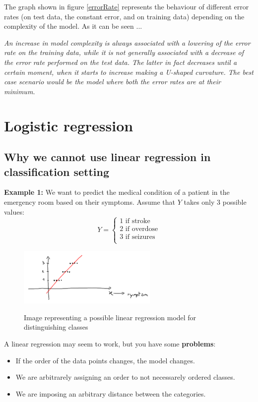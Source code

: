 The graph shown in figure \ref{errorRate} represents the behaviour of different
error rates (on test data, the constant error, and on training data) depending
on the complexity of the model. As it can be seen ... 

\begin{center}
\textit{An increase in model complexity is always associated with a lowering of
the error rate on the training data, while it is not generally associated with a
decrease of the error rate performed on the test data. The latter in fact
decreases until a certain moment, when it starts to increase making a U-shaped
curvature. The best case scenario would be the model where both the error rates
are at their minimum. }\end{center}


  \section{Logistic regression} \label{sect: logisticReg}
    \subsection{Why we cannot use linear regression in classification setting}
    \textbf{Example 1:} We want to predict the medical condition of a patient in
    the emergency room based on their symptoms. Assume that $Y$ takes only 3
    possible values:
    $$
    Y = \begin{cases}
          1 \text{ if stroke} \\
	      2 \text{ if overdose} \\
	      3 \text{ if seizures} \\
        \end{cases}
    $$

\begin{figure}[H]
\caption{Image representing a possible linear regression model for distinguishing classes}
\centering
\includegraphics[width=0.6\textwidth]{LinearRegForClassification}
\label{}
\end{figure}


    A linear regression may seem to work, but you have some \textbf{problems}:
    \begin{itemize}
      \item If the order of the data points changes, the model changes.
      \item We are arbitrarely assigning an order to not necessarely ordered
      classes.
      \item We are imposing an arbitrary distance between the categories. 
    \end{itemize}

